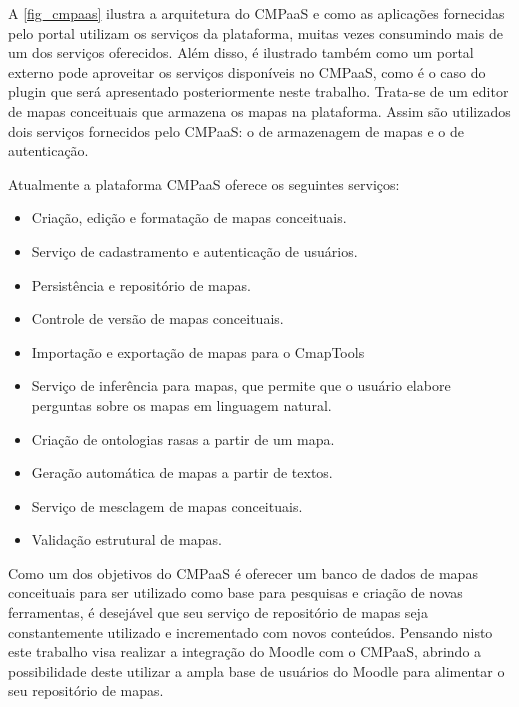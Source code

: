 \documentclass[
	12pt,				%
	openright,			%
	oneside,			%
	a4paper,			%
	english,			%
	french,				%
	spanish,			%
	brazil				%
	]{abntex2}
\begin{document}
A \autoref{fig_cmpaas} ilustra a arquitetura do CMPaaS e como as aplicações fornecidas pelo portal utilizam os serviços da plataforma, muitas vezes consumindo mais de um dos serviços oferecidos. Além disso, é ilustrado também como um portal externo pode aproveitar os serviços disponíveis no CMPaaS, como é o caso do plugin que será apresentado posteriormente neste trabalho. Trata-se de um editor de mapas conceituais que armazena os mapas na plataforma. Assim são utilizados dois serviços fornecidos pelo CMPaaS: o de armazenagem de mapas e o de autenticação.

Atualmente a plataforma CMPaaS oferece os seguintes serviços:

\begin{itemize}
	\item Criação, edição e formatação de mapas conceituais.
	\item Serviço de cadastramento e autenticação de usuários.
	\item Persistência e repositório de mapas.
	\item Controle de versão de mapas conceituais.
	\item Importação e exportação de mapas para o CmapTools
	\item Serviço de inferência para mapas, que permite que o usuário elabore perguntas sobre os mapas em linguagem natural.
	\item Criação de ontologias rasas a partir de um mapa.
	\item Geração automática de mapas a partir de textos.
	\item Serviço de mesclagem de mapas conceituais.
	\item Validação estrutural de mapas.
\end{itemize}

 Como um dos objetivos do CMPaaS é oferecer um banco de dados de mapas conceituais para ser utilizado como base para pesquisas e criação de novas ferramentas, é desejável que seu serviço de repositório de mapas seja constantemente utilizado e incrementado com novos conteúdos. Pensando nisto este trabalho visa realizar a integração do Moodle com o CMPaaS, abrindo a possibilidade deste utilizar a ampla base de usuários do Moodle para alimentar o seu repositório de mapas. 



\end{document}
